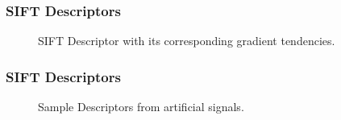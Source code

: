 \documentclass[11pt]{beamer}
\begin{document}
    \begin{frame}
        \frametitle{SIFT Descriptors}
        \begin{center}
   			\begin{figure}[thpb]
      		\centering
      		\setlength\fboxsep{0pt}
	  		\setlength\fboxrule{0.5pt}
      		\caption{\centering  SIFT Descriptor with its corresponding gradient tendencies.}
      		\label{figure1}
   			\end{figure}        
        \end{center}
    \end{frame}   
    
    \begin{frame}
        \frametitle{SIFT Descriptors}
        \begin{center}
   			\begin{figure}[thpb]
      		\centering
      		\setlength\fboxsep{0pt}
	  		\setlength\fboxrule{0.5pt}
      		\caption{\centering Sample Descriptors from artificial signals.}
      		\label{figure1}
   			\end{figure}        
        \end{center}
    \end{frame}       
        
\end{document}

